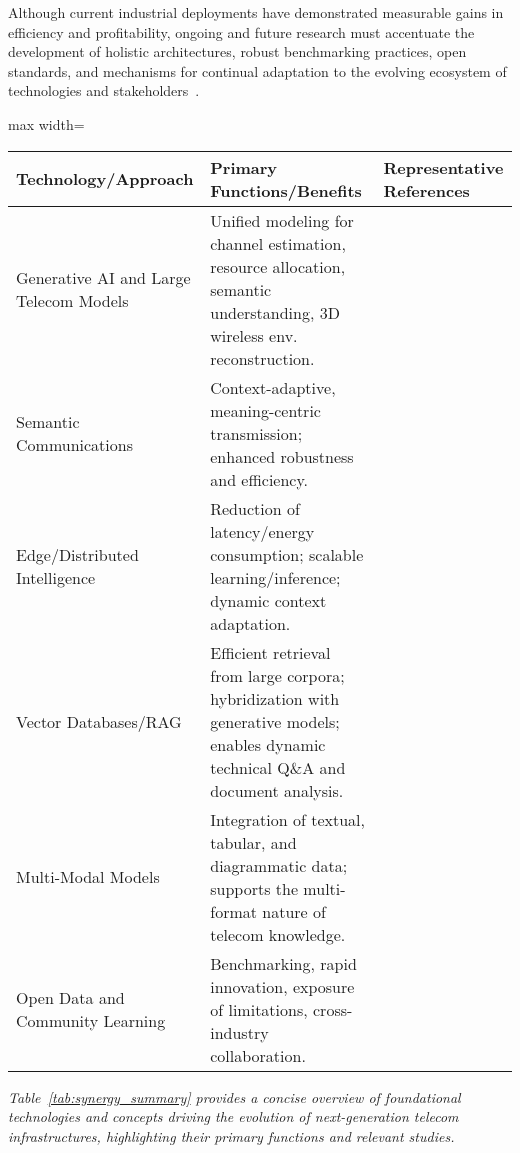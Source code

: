 Although current industrial deployments have demonstrated measurable gains in efficiency and profitability, ongoing and future research must accentuate the development of holistic architectures, robust benchmarking practices, open standards, and mechanisms for continual adaptation to the evolving ecosystem of technologies and stakeholders~\cite{ref11,ref21,ref22,ref23,ref24,ref25,ref49}.

\begin{table*}[htbp]
\centering
\caption{Summary of Key Synergistic Technologies and Their Roles in Next-Gen Telecom}
\label{tab:synergy_summary}
\begin{adjustbox}{max width=\textwidth}
\begin{tabular}{lll}
\toprule
\textbf{Technology/Approach} & \textbf{Primary Functions/Benefits} & \textbf{Representative References} \\
\midrule
Generative AI and Large Telecom Models  & Unified modeling for channel estimation, resource allocation, semantic understanding, 3D wireless env. reconstruction. & \cite{ref24,ref20,ref26} \\
Semantic Communications   & Context-adaptive, meaning-centric transmission; enhanced robustness and efficiency. & \cite{ref20,ref26} \\
Edge/Distributed Intelligence & Reduction of latency/energy consumption; scalable learning/inference; dynamic context adaptation. & \cite{ref12,ref14,ref19,ref21,ref25} \\
Vector Databases/RAG  & Efficient retrieval from large corpora; hybridization with generative models; enables dynamic technical Q\&A and document analysis. & \cite{ref11,ref22,ref23,ref29} \\
Multi-Modal Models  & Integration of textual, tabular, and diagrammatic data; supports the multi-format nature of telecom knowledge. & \cite{ref21,ref29} \\
Open Data and Community Learning & Benchmarking, rapid innovation, exposure of limitations, cross-industry collaboration. & \cite{ref11,ref21,ref22,ref23} \\
\bottomrule
\end{tabular}
\end{adjustbox}
\end{table*}

\textit{Table~\ref{tab:synergy_summary} provides a concise overview of foundational technologies and concepts driving the evolution of next-generation telecom infrastructures, highlighting their primary functions and relevant studies.}

